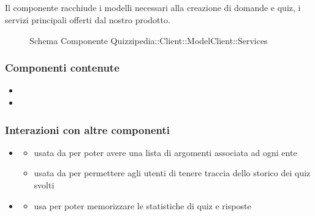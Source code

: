 \subsection{}
Il componente racchiude i modelli necessari alla creazione di domande e quiz, i servizi principali offerti dal nostro prodotto.
\begin{figure}[H]
\centering
\noindent{}
\caption[Schema Componente Quizzipedia::Client::ModelClient::Services]{Schema Componente Quizzipedia::Client::ModelClient::Services}
\end{figure}
\subsubsection{Componenti contenute}
\begin{itemize}
\item {}
\item {}
\end{itemize}
\subsubsection{Interazioni con altre componenti}
\begin{itemize}
\item {}
\begin{itemize}
\item usata da  per poter avere una lista di argomenti associata ad ogni ente
\item usata da  per permettere agli utenti di tenere traccia dello storico dei quiz svolti
\end{itemize}
\item {}
\begin{itemize}
\item usa  per poter memorizzare le statistiche di quiz e risposte
\end{itemize}
\end{itemize}
